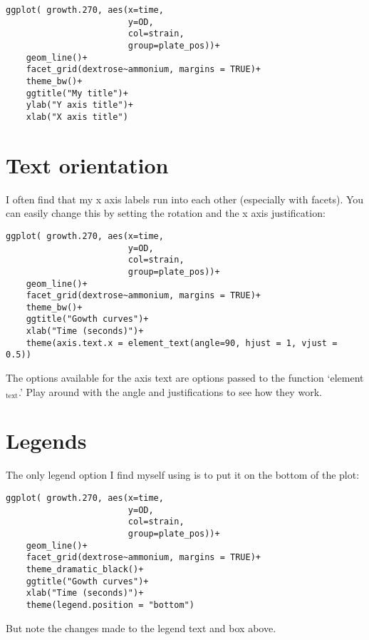 \documentclass[11pt]{article}
\begin{document}
\begin{verbatim}
ggplot( growth.270, aes(x=time,
                        y=OD,
                        col=strain,
                        group=plate_pos))+
    geom_line()+
    facet_grid(dextrose~ammonium, margins = TRUE)+
    theme_bw()+
    ggtitle("My title")+
    ylab("Y axis title")+
    xlab("X axis title")
\end{verbatim}
\section{Text orientation}
\label{sec-3}




I often find that my x axis labels run into each other (especially
with facets). You can easily change this by setting the rotation and
the x axis justification:

\begin{verbatim}
ggplot( growth.270, aes(x=time,
                        y=OD,
                        col=strain,
                        group=plate_pos))+
    geom_line()+
    facet_grid(dextrose~ammonium, margins = TRUE)+
    theme_bw()+
    ggtitle("Gowth curves")+
    xlab("Time (seconds)")+
    theme(axis.text.x = element_text(angle=90, hjust = 1, vjust = 0.5))
\end{verbatim}


The options available for the axis text are options passed to the
function `element$_{\mathrm{text}}$.' Play around with the angle and justifications
to see how they work.
\section{Legends}
\label{sec-4}


The only legend option I find myself using is to put it on the bottom
of the plot:

\begin{verbatim}
ggplot( growth.270, aes(x=time,
                        y=OD,
                        col=strain,
                        group=plate_pos))+
    geom_line()+
    facet_grid(dextrose~ammonium, margins = TRUE)+
    theme_dramatic_black()+
    ggtitle("Gowth curves")+
    xlab("Time (seconds)")+
    theme(legend.position = "bottom")
\end{verbatim}


But note the changes made to the legend text and box above.
\end{document}
